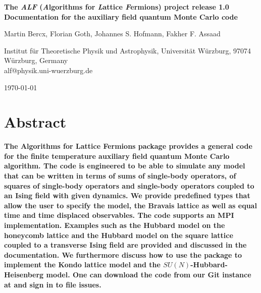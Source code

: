 \documentclass{SciPost}
\begin{document}
\begin{center}{\Large \textbf{
The \emph{ALF} (\emph{A}lgorithms for \emph{L}attice \emph{F}ermions) project release 1.0\\
Documentation for the  auxiliary field quantum Monte Carlo  code
}}\end{center}

\begin{center}
Martin Bercx,  Florian Goth,  Johannes S. Hofmann, Fakher F. Assaad 
\end{center}

\begin{center}
Institut f\"ur Theoretische Physik und Astrophysik, Universit\"at W\"urzburg, 97074 W\"urzburg, Germany
\\
alf@physik.uni-wuerzburg.de
\end{center}

\begin{center}
\today
\end{center}


\section*{Abstract}
{\bf 
The Algorithms for Lattice Fermions package provides a general code for the finite temperature auxiliary field quantum Monte Carlo algorithm.       The code  is engineered to  be able to simulate any model that can be written in terms of  sums of single-body operators, of squares of single-body operators and single-body operators coupled to an Ising field with  given dynamics. We  provide predefined types that allow  the user to specify the model, the  Bravais lattice  as well as equal time and time displaced observables.     The code supports an MPI implementation.   Examples such as the Hubbard model on the honeycomb lattice and  the Hubbard model  on the square lattice coupled to a transverse Ising field are  provided and discussed in the documentation.  We furthermore discuss  how to use the package  to implement  the Kondo lattice model and  the $SU(N)$-Hubbard-Heisenberg model.   One can download the code from our Git instance at   and sign in to  file issues. 
}
\end{document}

